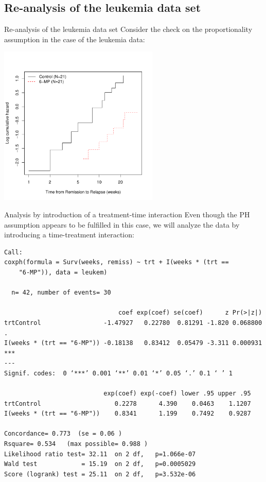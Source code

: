 \documentclass[envcountsect, 10pt, portrait, palatino]{beamer}
\begin{document}
\subsection{Re-analysis of the leukemia data set}
\begin{frame}{Re-analysis of the leukemia data set}
Consider the check on the proportionality assumption in the case of the leukemia data:\\[-4ex]
\centerline{\includegraphics[width=3in]{leukemlogHaz.pdf}}
\end{frame}
\begin{frame}[fragile]{Analysis by introduction of a treatment-time interaction}
Even though the PH assumption appears to be fulfilled in this case, we will analyze the data by introducing a time-treatment interaction:

\scriptsize
\begin{verbatim}
Call:
coxph(formula = Surv(weeks, remiss) ~ trt + I(weeks * (trt ==
    "6-MP")), data = leukem)

  n= 42, number of events= 30

                               coef exp(coef) se(coef)      z Pr(>|z|)
trtControl                 -1.47927   0.22780  0.81291 -1.820 0.068800 .
I(weeks * (trt == "6-MP")) -0.18138   0.83412  0.05479 -3.311 0.000931 ***
---
Signif. codes:  0 ‘***’ 0.001 ‘**’ 0.01 ‘*’ 0.05 ‘.’ 0.1 ‘ ’ 1

                           exp(coef) exp(-coef) lower .95 upper .95
trtControl                    0.2278      4.390    0.0463    1.1207
I(weeks * (trt == "6-MP"))    0.8341      1.199    0.7492    0.9287

Concordance= 0.773  (se = 0.06 )
Rsquare= 0.534   (max possible= 0.988 )
Likelihood ratio test= 32.11  on 2 df,   p=1.066e-07
Wald test            = 15.19  on 2 df,   p=0.0005029
Score (logrank) test = 25.11  on 2 df,   p=3.532e-06
\end{verbatim}
\end{frame}
\end{document}
